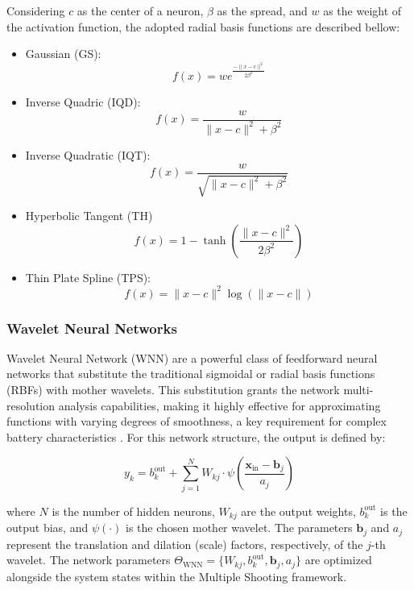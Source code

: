 \documentclass[lettersize,journal]{IEEEtran}
\begin{document}
Considering $c$ as the center of a neuron, $\beta$ as the spread, and $w$ as the weight of the activation function, the adopted radial basis functions are described bellow:
\begin{itemize}
	\item Gaussian (GS):
	\begin{equation}
		f(x)=we^{\frac{-\|x-c\|^2}{2\beta^2}}
	\end{equation}
	\item Inverse Quadric (IQD):
	\begin{equation}
		f(x) = \frac{w}{\|x-c\|^2+\beta^2}
	\end{equation}
	\item Inverse Quadratic (IQT):
	\begin{equation}
		f(x) = \frac{w}{\sqrt{\|x-c\|^2+\beta^2}}
	\end{equation}
	\item Hyperbolic Tangent (TH)
	\begin{equation}
		f(x) = 1-\tanh\left(\frac{\|x-c\|^2}{2\beta^2}\right)
	\end{equation}
	\item Thin Plate Spline (TPS):
	\begin{equation}
		f(x) = \|x-c\|^2\log\left(\|x-c\|\right)
	\end{equation}
\end{itemize}

\subsubsection{Wavelet Neural Networks}

Wavelet Neural Network (WNN) are a powerful class of feedforward neural networks that substitute the traditional sigmoidal or radial basis functions (RBFs) with mother wavelets. This substitution grants the network multi-resolution analysis capabilities, making it highly effective for approximating functions with varying degrees of smoothness, a key requirement for complex battery characteristics \cite{Sahoo2023LBFGS}. For this network structure, the output is defined by:

\begin{equation}
	y_k = b_{k}^{\text{out}} + \sum_{j=1}^{N} W_{kj} \cdot \psi\left(\frac{\mathbf{x}_{\text{in}} - \mathbf{b}_j}{a_j}\right)
\end{equation}

where $N$ is the number of hidden neurons, $W_{kj}$ are the output weights, $b_{k}^{\text{out}}$ is the output bias, and $\psi(\cdot)$ is the chosen mother wavelet. The parameters $\mathbf{b}_j$ and $a_j$ represent the translation and dilation (scale) factors, respectively, of the $j$-th wavelet. The network parameters $\Theta_{\text{WNN}} = \{W_{kj}, b_{k}^{\text{out}}, \mathbf{b}_j, a_j\}$ are optimized alongside the system states within the Multiple Shooting framework.
\end{document}
